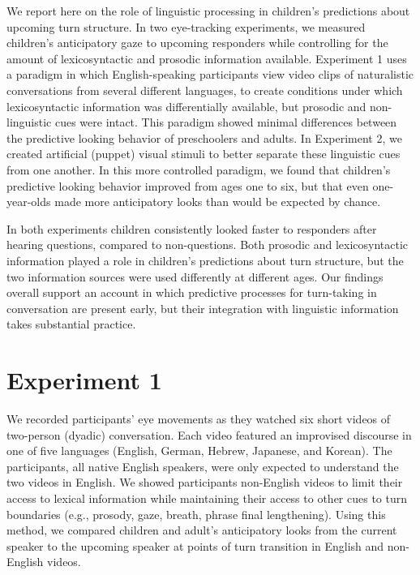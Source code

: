 \documentclass[authoryear, 12pt]{elsarticle}
\begin{document}
We report here on the role of linguistic processing in children's predictions about upcoming turn structure. In two eye-tracking experiments, we measured children's anticipatory gaze to upcoming responders while controlling for the amount of lexicosyntactic and prosodic information available. Experiment 1 uses a paradigm in which English-speaking participants view video clips of naturalistic conversations from several different languages, to create conditions under which lexicosyntactic information was differentially available, but prosodic and non-linguistic cues were intact. This paradigm showed minimal differences between the predictive looking behavior of preschoolers and adults. In Experiment 2, we created artificial (puppet) visual stimuli to better separate these linguistic cues from one another. In this more controlled paradigm, we found that children's predictive looking behavior improved from ages one to six, but that even one-year-olds made more anticipatory looks than would be expected by chance. 

In both experiments children consistently looked faster to responders after hearing questions, compared to non-questions. Both prosodic and lexicosyntactic information played a role in children's predictions about turn structure, but the two information sources were used differently at different ages. Our findings overall support an account in which predictive processes for turn-taking in conversation are present early, but their integration with linguistic information takes substantial practice. 

\section{Experiment 1}
\label{sec:exp1}

We recorded participants' eye movements as they watched six short videos of two-person (dyadic) conversation. Each video featured an improvised discourse in one of five languages (English, German, Hebrew, Japanese, and Korean). The participants, all native English speakers, were only expected to understand the two videos in English. We showed participants non-English videos to limit their access to lexical information while maintaining their access to other cues to turn boundaries (e.g., prosody, gaze, breath, phrase final lengthening). Using this method, we compared children and adult's anticipatory looks from the current speaker to the upcoming speaker at points of turn transition in English and non-English videos.
\end{document}
